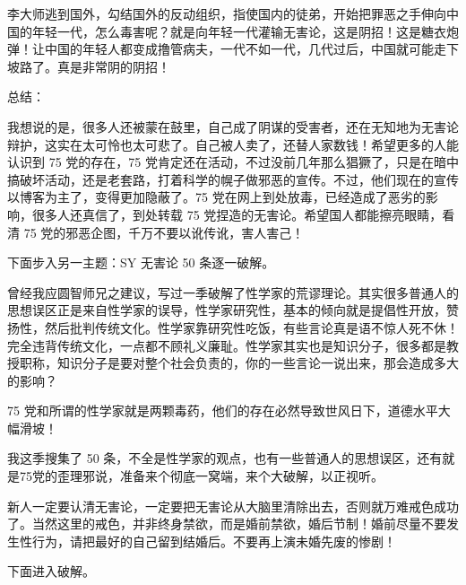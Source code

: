 李大师逃到国外，勾结国外的反动组织，指使国内的徒弟，开始把罪恶之手伸向中国的年轻一代，怎么毒害呢？就是向年轻一代灌输无害论，这是阴招！这是糖衣炮弹！让中国的年轻人都变成撸管病夫，一代不如一代，几代过后，中国就可能走下坡路了。真是非常阴的阴招！

总结：

我想说的是，很多人还被蒙在鼓里，自己成了阴谋的受害者，还在无知地为无害论辩护，这实在太可怜也太可悲了。自己被人卖了，还替人家数钱！希望更多的人能认识到 75 党的存在，75 党肯定还在活动，不过没前几年那么猖獗了，只是在暗中搞破坏活动，还是老套路，打着科学的幌子做邪恶的宣传。不过，他们现在的宣传以博客为主了，变得更加隐蔽了。75 党在网上到处放毒，已经造成了恶劣的影响，很多人还真信了，到处转载 75 党捏造的无害论。希望国人都能擦亮眼睛，看清 75 党的邪恶企图，千万不要以讹传讹，害人害己！


下面步入另一主题：SY 无害论 50 条逐一破解。

曾经我应圆智师兄之建议，写过一季破解了性学家的荒谬理论。其实很多普通人的思想误区正是来自性学家的误导，性学家研究性，基本的倾向就是提倡性开放，赞扬性，然后批判传统文化。性学家靠研究性吃饭，有些言论真是语不惊人死不休！完全违背传统文化，一点都不顾礼义廉耻。性学家其实也是知识分子，很多都是教授职称，知识分子是要对整个社会负责的，你的一些言论一说出来，那会造成多大的影响？

75 党和所谓的性学家就是两颗毒药，他们的存在必然导致世风日下，道德水平大幅滑坡！

我这季搜集了 50 条，不全是性学家的观点，也有一些普通人的思想误区，还有就是75党的歪理邪说，准备来个彻底一窝端，来个大破解，以正视听。

新人一定要认清无害论，一定要把无害论从大脑里清除出去，否则就万难戒色成功了。当然这里的戒色，并非终身禁欲，而是婚前禁欲，婚后节制！婚前尽量不要发生性行为，请把最好的自己留到结婚后。不要再上演未婚先废的惨剧！

下面进入破解。

